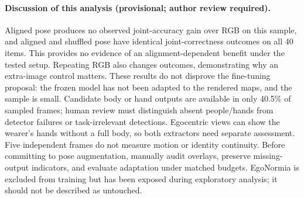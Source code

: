 \paragraph{Discussion of this analysis (provisional; author review required).} Aligned pose produces no observed joint-accuracy gain over RGB on this sample, and aligned and shuffled pose have identical joint-correctness outcomes on all 40 items. This provides no evidence of an alignment-dependent benefit under the tested setup. Repeating RGB also changes outcomes, demonstrating why an extra-image control matters. These results do not disprove the fine-tuning proposal: the frozen model has not been adapted to the rendered maps, and the sample is small. Candidate body or hand outputs are available in only 40.5\% of sampled frames; human review must distinguish absent people/hands from detector failures or task-irrelevant detections. Egocentric views can show the wearer's hands without a full body, so both extractors need separate assessment. Five independent frames do not measure motion or identity continuity. Before committing to pose augmentation, manually audit overlays, preserve missing-output indicators, and evaluate adaptation under matched budgets. EgoNormia is excluded from training but has been exposed during exploratory analysis; it should not be described as untouched.

